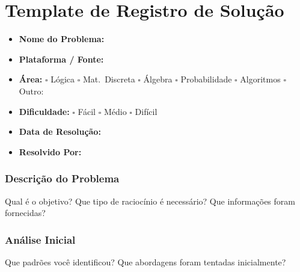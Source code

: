 \documentclass[12pt, a4paper]{article}
\begin{document}
\clearpage

\section{Template de Registro de Solução}

\begin{infobox}[title=\textbf{Informações Básicas}]
  \begin{itemize}[leftmargin=1.2em]
    \item \textbf{Nome do Problema:} \hrulefill
    \item \textbf{Plataforma / Fonte:} \hrulefill
    \item \textbf{Área:} \hspace{0.3em}
      $\square$ Lógica \hspace{0.3em}
      $\square$ Mat.\ Discreta \hspace{0.3em}
      $\square$ Álgebra \hspace{0.3em}
      $\square$ Probabilidade \hspace{0.3em}
      $\square$ Algoritmos \hspace{0.3em}
      $\square$ Outro: \underline{\hspace{1.5cm}}
    \item \textbf{Dificuldade:} \hspace{0.3em}
      $\square$ Fácil \hspace{0.3em}
      $\square$ Médio \hspace{0.3em}
      $\square$ Difícil
    \item \textbf{Data de Resolução:} \hrulefill
    \item \textbf{Resolvido Por:} \hrulefill
  \end{itemize}
\end{infobox}

\vspace{0.8em}
\subsubsection*{Descrição do Problema}
Qual é o objetivo? Que tipo de raciocínio é necessário? Que informações foram fornecidas?
\vspace{3.5em}

\subsubsection*{Análise Inicial}
Que padrões você identificou? Que abordagens foram tentadas inicialmente?
\vspace{3.5em}
\end{document}
